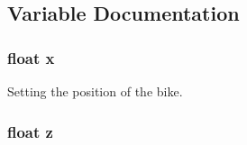 \subsection{Variable Documentation}
\subsubsection[{x}]{\setlength{\rightskip}{0pt plus 5cm}float x}\label{read_8h_ad0da36b2558901e21e7a30f6c227a45e}


Setting the position of the bike. 

\subsubsection[{z}]{\setlength{\rightskip}{0pt plus 5cm}float z}\label{read_8h_af73583b1e980b0aa03f9884812e9fd4d}
